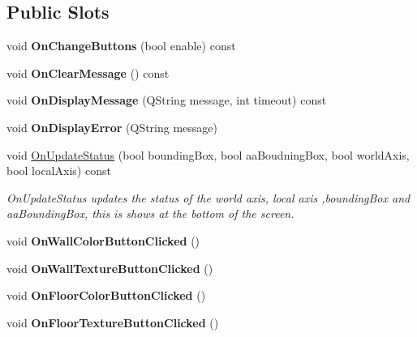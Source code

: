 \subsection*{Public Slots}
\begin{DoxyCompactItemize}
\item 
\hypertarget{class_main_window_abbfa33a7dbb6b6030aa117806e2a36dd}{}void {\bfseries On\+Change\+Buttons} (bool enable) const \label{class_main_window_abbfa33a7dbb6b6030aa117806e2a36dd}

\item 
\hypertarget{class_main_window_a28331903348b5b595826b88cc4ec8d65}{}void {\bfseries On\+Clear\+Message} () const \label{class_main_window_a28331903348b5b595826b88cc4ec8d65}

\item 
\hypertarget{class_main_window_a653116cd69aa29994ba258b6ae017aa1}{}void {\bfseries On\+Display\+Message} (Q\+String message, int timeout) const \label{class_main_window_a653116cd69aa29994ba258b6ae017aa1}

\item 
\hypertarget{class_main_window_ac6d6167eed399f17310482299e5600be}{}void {\bfseries On\+Display\+Error} (Q\+String message)\label{class_main_window_ac6d6167eed399f17310482299e5600be}

\item 
void \hyperlink{class_main_window_a1d28d674453152dece0a01678317b212}{On\+Update\+Status} (bool bounding\+Box, bool aa\+Boudning\+Box, bool world\+Axis, bool local\+Axis) const 
\begin{DoxyCompactList}\small\item\em On\+Update\+Status updates the status of the world axis, local axis ,bounding\+Box and aa\+Bounding\+Box, this is shows at the bottom of the screen. \end{DoxyCompactList}\item 
\hypertarget{class_main_window_aece5c2367706593bc723197c31dba842}{}void {\bfseries On\+Wall\+Color\+Button\+Clicked} ()\label{class_main_window_aece5c2367706593bc723197c31dba842}

\item 
\hypertarget{class_main_window_a128805a4505588f76abb1fb6897b75ab}{}void {\bfseries On\+Wall\+Texture\+Button\+Clicked} ()\label{class_main_window_a128805a4505588f76abb1fb6897b75ab}

\item 
\hypertarget{class_main_window_a518fec1c228151b47ed59a2f0a0ad7cf}{}void {\bfseries On\+Floor\+Color\+Button\+Clicked} ()\label{class_main_window_a518fec1c228151b47ed59a2f0a0ad7cf}

\item 
\hypertarget{class_main_window_a162c53dee72bb98df3255a4a3f30eb06}{}void {\bfseries On\+Floor\+Texture\+Button\+Clicked} ()\label{class_main_window_a162c53dee72bb98df3255a4a3f30eb06}

\end{DoxyCompactItemize}
